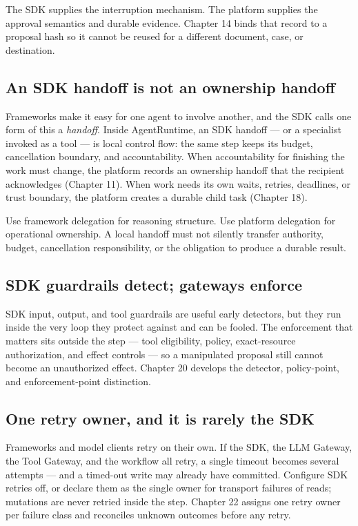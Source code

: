 The SDK supplies the interruption mechanism. The platform supplies the approval semantics and durable evidence. Chapter 14 binds that record to a proposal hash so it cannot be reused for a different document, case, or destination.\par

\subsection{An SDK handoff is not an ownership handoff}

Frameworks make it easy for one agent to involve another, and the SDK calls one form of this a \emph{handoff}. Inside AgentRuntime, an SDK handoff — or a specialist invoked as a tool — is local control flow: the same step keeps its budget, cancellation boundary, and accountability. When accountability for finishing the work must change, the platform records an ownership handoff that the recipient acknowledges (Chapter 11). When work needs its own waits, retries, deadlines, or trust boundary, the platform creates a durable child task (Chapter 18).\par

Use framework delegation for reasoning structure. Use platform delegation for operational ownership. A local handoff must not silently transfer authority, budget, cancellation responsibility, or the obligation to produce a durable result.\par

\subsection{SDK guardrails detect; gateways enforce}

SDK input, output, and tool guardrails are useful early detectors, but they run inside the very loop they protect against and can be fooled. The enforcement that matters sits outside the step — tool eligibility, policy, exact-resource authorization, and effect controls — so a manipulated proposal still cannot become an unauthorized effect. Chapter 20 develops the detector, policy-point, and enforcement-point distinction.\par

\subsection{One retry owner, and it is rarely the SDK}

Frameworks and model clients retry on their own. If the SDK, the LLM Gateway, the Tool Gateway, and the workflow all retry, a single timeout becomes several attempts — and a timed-out write may already have committed. Configure SDK retries off, or declare them as the single owner for transport failures of reads; mutations are never retried inside the step. Chapter 22 assigns one retry owner per failure class and reconciles unknown outcomes before any retry.\par

